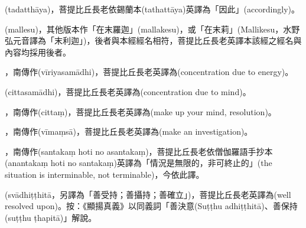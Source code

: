 \startitemgroup[noteitems]
\item{}(tadatthāya)，菩提比丘長老依錫蘭本(tathattāya)英譯為「因此」(accordingly)。
\stopitemgroup

\startitemgroup[noteitems]
\item{}(mallesu)，其他版本作「在末羅迦」(mallakesu)，或「在末莉」(Mallikesu，水野弘元音譯為「末利迦」)，後者與本經經名相符，菩提比丘長老英譯本該經之經名與內容均採用後者。
\stopitemgroup

\startitemgroup[noteitems]
\item{}，南傳作(vīriyasamādhi)，菩提比丘長老英譯為(concentration due to energy)。
\stopitemgroup

\startitemgroup[noteitems]
\item{}(cittasamādhi)，菩提比丘長老英譯為(concentration due to mind)。
\stopitemgroup

\startitemgroup[noteitems]
\item{}，南傳作(cittaṃ)，菩提比丘長老英譯為(make up your mind, resolution)。
\stopitemgroup

\startitemgroup[noteitems]
\item{}，南傳作(vīmaṃsā)，菩提比丘長老英譯為(make an investigation)。
\stopitemgroup

\startitemgroup[noteitems]
\item{}，南傳作(santakaṃ hoti no asantakaṃ)，菩提比丘長老依僧伽羅語手抄本(anantakaṃ hoti no santakaṃ)英譯為「情況是無限的，非可終止的」(the situation is interminable, not terminable)，今依此譯。
\stopitemgroup

\startitemgroup[noteitems]
\item{}(svādhiṭṭhitā，另譯為「善受持；善攝持；善確立」)，菩提比丘長老英譯為(well resolved upon)。按：《顯揚真義》以同義詞「善決意(Suṭṭhu adhiṭṭhitā)、善保持(suṭṭhu ṭhapitā)」解說。
\stopitemgroup

